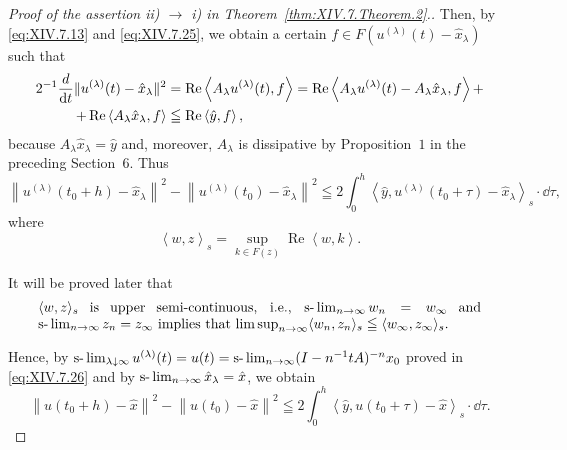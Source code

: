 \begin{proof}[Proof of the assertion ii) $\rightarrow$ i) in Theorem~\ref{thm:XIV.7.Theorem.2}.]
Then, by \eqref{eq:XIV.7.13} and \eqref{eq:XIV.7.25}, we obtain a certain $f \in F(u^{(\lambda)}(t) - \hat{x}_{\lambda})$ such that 
\begin{align}
2 ^{-1} \frac {d}{\mathop{}\!\mathrm{d} t} \| u ^{(\lambda)} (t) - \hat {x} _{\lambda} \| ^{2}& = \operatorname{Re} \left\langle A _{\lambda} u ^{(\lambda)} (t), f \right\rangle = \operatorname{Re} \left\langle A _{\lambda} u ^{(\lambda)} (t) - A _{\lambda} \hat {x} _{\lambda}, f \right\rangle + \notag \\
+ \operatorname{Re} \left\langle A _{\lambda} \hat {x} _{\lambda}, f \right\rangle& \leqq \operatorname{Re} \left\langle \hat {y}, f \right\rangle , \notag
\end{align}
because $A_{\lambda} \hat{x}_{\lambda} = \hat{y}$ and, moreover, $A_{\lambda}$ is dissipative by Proposition~\hyperref[prop:XIV.6.Proposition.1]{$1$} in the preceding Section~\hyperref[sec:XIV.6]{$6$}. Thus 
\begin{equation}\label{eq:XIV.7.39}
\left\| u ^{(\lambda)} \left(t _{0} + h\right) - \hat {x} _{\lambda} \right\| ^{2} - \left\| u ^{(\lambda)} \left(t _{0}\right) - \hat {x} _{\lambda} \right\| ^{2} \leqq 2 \int_{0} ^{h} \left\langle \hat {y}, u ^{(\lambda)} \left(t _{0} + \tau\right) - \hat {x} _{\lambda} \right\rangle_{s} \cdot \dd \tau ,
\end{equation}
where 
\begin{equation}\label{eq:XIV.7.40}
\left\langle w, z \right\rangle_{s} = \sup\limits _{k \in F (z)} \operatorname{Re} \left\langle w, k \right\rangle .
\end{equation}

It will be proved later that 
\begin{equation}
\label{eq:XIV.7.41}
\begin{minipage}{0.92\linewidth}
\everymath{}\let\limits\nolimits
$\langle w,z\rangle_s $ is upper semi-continuous, i.e., $\slim_{n\to\infty}w_n=w_\infty$ and $\slim_{n\to\infty}z_n =z_\infty$ implies that $\limsup\limits_{n\to\infty}\langle w_n,z_n\rangle_s\leqq\langle w_\infty,z_\infty\rangle_s.$
\end{minipage}
\end{equation} 

Hence, by $\slim\limits_{\lambda \downarrow \infty} u^{(\lambda)}(t) = u(t) = \slim\limits_{n \to \infty} (I - n^{-1}tA)^{-n} x_0$ proved in \eqref{eq:XIV.7.26} and by $\slim\limits_{n \to \infty} \hat{x}_\lambda = \hat{x}$, we obtain 
\begin{equation}\label{eq:XIV.7.42}
\left\| u \left(t _{0} + h\right) - \hat {x} \right\| ^{2} - \left\| u \left(t _{0}\right) - \hat {x} \right\| ^{2} \leqq 2 \int_{0} ^{h} \left\langle \hat {y}, u \left(t _{0} + \tau\right) - \hat {x} \right\rangle_{s} \cdot \dd \tau .
\end{equation}


\end{proof}
